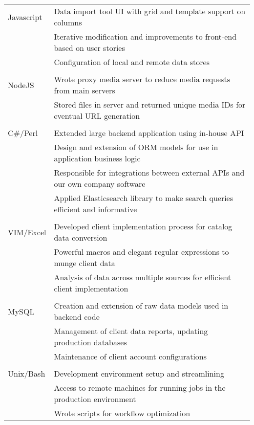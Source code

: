 \documentclass[11pt]{article}
\begin{document}
\begin{description}
\begin{description}
                \begin{tabular}{l|l}
                    Javascript & Data import tool UI with grid and template support on columns\\
                               & Iterative modification and improvements to front-end based on user stories\\
                               & Configuration of local and remote data stores\\
                                 \\
                    NodeJS     & Wrote proxy media server to reduce media requests from main servers \\
                               & Stored files in server and returned unique media IDs for eventual URL generation\\
                                 \\
                    C\#/Perl   & Extended large backend application using in-house API \\
                               & Design and extension of ORM models for use in application business logic \\
                               & Responsible for integrations between external APIs and our own company software \\
                               & Applied Elasticsearch library to make search queries efficient and informative\\
                                 \\
                    VIM/Excel  & Developed client implementation process for catalog data conversion\\
                               & Powerful macros and elegant regular expressions to munge client data\\
                               & Analysis of data across multiple sources for efficient client implementation\\
                                 \\
                    MySQL      & Creation and extension of raw data models used in backend code\\
                               & Management of client data reports, updating production databases\\
                               & Maintenance of client account configurations\\
                                 \\
                    Unix/Bash  & Development environment setup and streamlining\\
                               & Access to remote machines for running jobs in the production environment\\
                               & Wrote scripts for workflow optimization\\
                \end{tabular}


\end{description}
\end{description}
\end{document}
